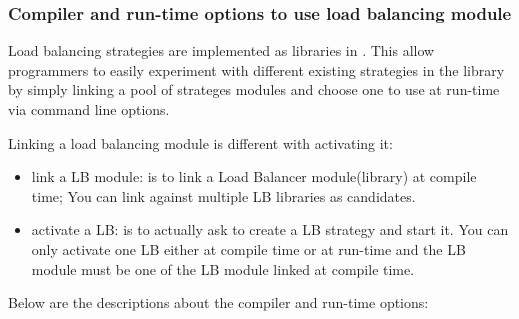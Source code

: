 \subsubsection{Compiler and run-time options to use load balancing module}

Load balancing strategies are implemented as libraries in \charmpp{}. This
allow programmers to easily experiment with different existing strategies 
in the library by simply linking a pool of strateges modules and choose 
one to use at run-time via command line options.

Linking a load balancing module is different with activating it:
\begin{itemize}
\item link a LB module: is to link a Load Balancer module(library) at 
   compile time; You can link against multiple LB libraries as candidates.
\item activate a LB: is to actually ask to create a LB strategy and 
   start it. You can only activate one LB either at compile time or at
   run-time and the LB module must be one of the LB module linked at 
   compile time.
\end{itemize}


Below are the descriptions about the compiler and run-time options:

